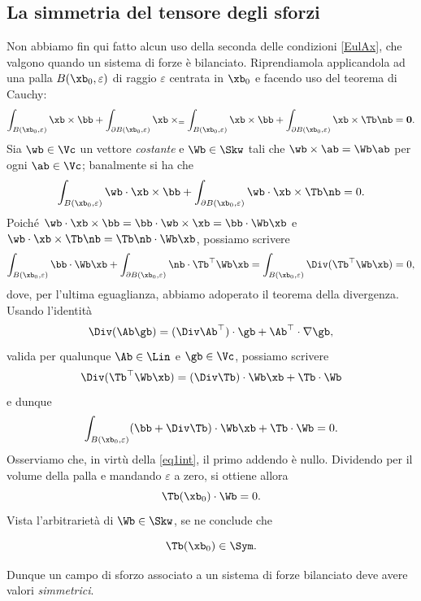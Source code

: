 \subsection{La simmetria del tensore degli sforzi}
Non abbiamo fin qui fatto alcun uso della seconda delle condizioni \eqref{EulAx}, che valgono quando un sistema di forze è bilanciato.  Riprendiamola applicandola ad una palla $B(\xb_0,\varepsilon)$ di raggio $\varepsilon$ centrata in $\xb_0$ e facendo uso del teorema di Cauchy:
\begin{equation}
	\int_{ B(\xb_0,\varepsilon)}\xb \times \bb +	\int_{ \partial B(\xb_0,\varepsilon)}\xb \times \sb=	\int_{ B(\xb_0,\varepsilon)}\xb \times \bb +	\int_{ \partial B(\xb_0,\varepsilon)}\xb \times \Tb \nb=\mathbf{0}.
\end{equation}
Sia $\wb\in \Vc$ un vettore \textit{costante} e $\Wb\in \Skw$ tali che $\wb\times\ab=\Wb\ab$ per ogni $\ab\in\Vc$; banalmente si ha che
\begin{equation}
\int_{ B(\xb_0,\varepsilon)}\wb\cdot \xb \times \bb +	\int_{ \partial B(\xb_0,\varepsilon)}\wb\cdot \xb \times \Tb \nb=0.
\end{equation}
Poiché $\wb\cdot \xb\times \bb=\bb\cdot \wb\times\xb =\bb\cdot \Wb \xb$ e $\wb\cdot \xb \times \Tb \nb=\Tb\nb\cdot \Wb \xb$, possiamo scrivere
\begin{equation}
\int_{ B(\xb_0,\varepsilon)}\bb\cdot \Wb \xb+	\int_{ \partial B(\xb_0,\varepsilon)}\nb\cdot\Tb^\top \Wb \xb=\int_{ B(\xb_0,\varepsilon)}\Div(\Tb^\top \Wb \xb)=0,
\end{equation}
dove, per l'ultima eguaglianza, abbiamo adoperato il teorema della divergenza. Usando l'identità
\begin{equation}
\Div (\Ab \gb)=(\Div \Ab^\top)\cdot \gb+\Ab^\top\cdot \nabla \gb,
\end{equation}
valida per qualunque $\Ab \in \Lin$ e $\gb \in \Vc$, possiamo scrivere 
\begin{equation}
\Div(\Tb^\top \Wb \xb)=(\Div \Tb)\cdot \Wb \xb+\Tb\cdot\Wb
\end{equation}
e dunque 
\begin{equation}
\int_{ B(\xb_0,\varepsilon)}(\bb+\Div\Tb)\cdot \Wb \xb +\Tb\cdot\Wb=0.
\end{equation}
Osserviamo che, in virtù della \eqref{eq1int}, il primo addendo è nullo. Dividendo per il volume della palla e mandando $\varepsilon$ a zero, si ottiene allora
\begin{equation}
	\Tb(\xb_0)\cdot \Wb=0.
\end{equation}
Vista l'arbitrarietà di $\Wb\in\Skw$, se ne conclude che 
\begin{definition}
	\begin{equation}
	\Tb(\xb_0)\in \Sym.
\end{equation}
\end{definition}
Dunque un campo di sforzo associato a un sistema di forze bilanciato deve avere valori \textit{simmetrici}.

